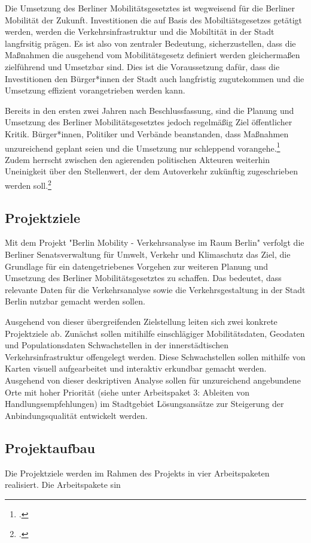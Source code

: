 Die Umsetzung des Berliner Mobilitätsgesetztes ist wegweisend für die Berliner Mobilität der Zukunft. Investitionen die auf Basis des Mobiltiätsgesetzes getätigt werden, werden die Verkehrsinfrastruktur und die Mobiltität in der Stadt langfrsitig prägen. Es ist also von zentraler Bedeutung, sicherzustellen, dass die Maßnahmen die ausgehend vom Mobilitätsgesetz definiert werden gleichermaßen zielführend und Umsetzbar sind. Dies ist die Voraussetzung dafür, dass die Investitionen den Bürger*innen der Stadt auch langfristig zugutekommen und die Umsetzung effizient vorangetrieben werden kann.

Bereits in den ersten zwei Jahren nach Beschlussfassung, sind die Planung und Umsetzung des Berliner Mobilitätsgesetztes jedoch regelmäßig Ziel öffentlicher Kritik. Bürger*innen, Politiker und Verbände beanstanden, dass Maßnahmen unzureichend geplant seien und die Umsetzung nur schleppend vorangehe.\footcite{Tagesspiegel.2019} Zudem herrscht zwischen den agierenden politischen Akteuren weiterhin Uneinigkeit über den Stellenwert, der dem Autoverkehr zukünftig zugeschrieben werden soll.\footcite{Tagesspiegel.2020} 

\subsection{Projektziele}
Mit dem Projekt "Berlin Mobility - Verkehrsanalyse im Raum Berlin" verfolgt die Berliner Senatsverwaltung für Umwelt, Verkehr und Klimaschutz das Ziel, die Grundlage für ein datengetriebenes Vorgehen zur weiteren Planung und Umsetzung des Berliner Mobilitätsgesetztes zu schaffen. Das bedeutet, dass relevante Daten für die Verkehrsanalyse sowie die Verkehrsgestaltung in der Stadt Berlin nutzbar gemacht werden sollen.

Ausgehend von dieser übergreifenden Zielstellung leiten sich zwei konkrete Projektziele ab. Zunächst sollen mitihilfe einschlägiger Mobilitätsdaten, Geodaten und Populationsdaten Schwachstellen in der innerstädtischen Verkehrsinfrastruktur offengelegt werden. Diese Schwachstellen sollen mithilfe von Karten visuell aufgearbeitet und interaktiv erkundbar gemacht werden. Ausgehend von dieser deskriptiven Analyse sollen für unzureichend angebundene Orte mit hoher Priorität (siehe unter Arbeitspaket 3: Ableiten von Handlungsempfehlungen) im Stadtgebiet Lösungsansätze zur Steigerung der Anbindungsqualität entwickelt werden.

\subsection{Projektaufbau}
Die Projektziele werden im Rahmen des Projekts in vier Arbeitspaketen realisiert. Die Arbeitspakete sin

